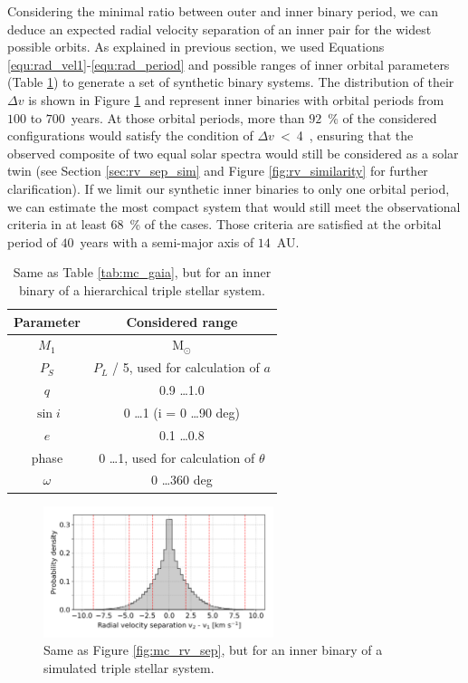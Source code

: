 Considering the minimal ratio between outer and inner binary period, we can deduce an expected radial velocity separation of an inner pair for the widest possible orbits. As explained in previous section, we used Equations \ref{equ:rad_vel1}-\ref{equ:rad_period} and possible ranges of inner orbital parameters (Table \ref{tab:mc_gaia_inner}) to generate a set of synthetic binary systems. The distribution of their $\Delta v$ is shown in Figure \ref{fig:mc_rv_sep_inner} and represent inner binaries with orbital periods from $100$ to $700$~years. At those orbital periods, more than $92$~\% of the considered configurations would satisfy the condition of $\Delta v$~<~4~\kms, ensuring that the observed composite of two equal solar spectra would still be considered as a solar twin (see Section \ref{sec:rv_sep_sim} and Figure \ref{fig:rv_similarity} for further clarification). If we limit our synthetic inner binaries to only one orbital period, we can estimate the most compact system that would still meet the observational criteria in at least $68$~\% of the cases. Those criteria are satisfied at the orbital period of $40$~years with a semi-major axis of $14$~AU. 

\begin{table}
	\centering
	\caption{Same as Table \ref{tab:mc_gaia}, but for an inner binary of a hierarchical triple stellar system.}
	\begin{tabular}{c | c}
		\hline
		Parameter & Considered range \\ 
		\hline
		$M_1$ & M$_{\odot}$ \\
		$P_S$ & $P_L$ / 5, used for calculation of $a$ \\
		$q$ & 0.9 \ldots 1.0 \\
		$\sin i$ & 0 \ldots 1 (i = 0 \ldots 90 deg)\\
		$e$ & 0.1 \ldots 0.8 \\
		phase & 0 \ldots 1, used for calculation of $\theta$ \\
		$\omega$ & 0 \ldots 360 deg \\
		\hline
	\end{tabular}
	\label{tab:mc_gaia_inner}
\end{table}

\begin{figure}
	\centering
	\includegraphics[width=0.6\textwidth]{MC_rv_from_sep_inner.png}
	\caption{Same as Figure \ref{fig:mc_rv_sep}, but for an inner binary of a simulated triple stellar system.}
	\label{fig:mc_rv_sep_inner}
\end{figure}

